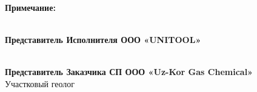 \documentclass[12pt]{article}
\begin{document}
\vspace{0.6em}

\textbf{Примечание:}\\

\underline{\hspace{12cm}}\\

\vspace{1.2em}

\textbf{Представитель Исполнителя ООО «UNITOOL»}\\[1.2em]
\underline{\hspace{12cm}}\\

\vspace{1.0em}

\textbf{Представитель Заказчика СП ООО «Uz-Kor Gas Chemical»}\\
Участковый геолог\\[1.2em]
\underline{\hspace{12cm}}\\
\end{document}
